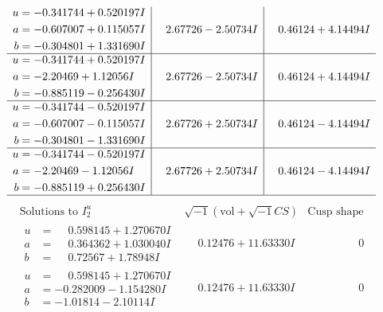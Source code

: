 \documentclass[1p]{elsarticle_modified}
\theoremstyle{definition}
\newcommand{\I}{\sqrt{-1}}
\begin{document}
$$\begin{array}{c|c|c}
\begin{aligned}
u &= -0.341744 + 0.520197 I \\
a &= -0.607007 + 0.115057 I \\
b &= -0.304801 + 1.331690 I\end{aligned}
 & \phantom{-}2.67726 - 2.50734 I & \phantom{-}0.46124 + 4.14494 I \\ \hline\begin{aligned}
u &= -0.341744 + 0.520197 I \\
a &= -2.20469 + 1.12056 I \\
b &= -0.885119 - 0.256430 I\end{aligned}
 & \phantom{-}2.67726 - 2.50734 I & \phantom{-}0.46124 + 4.14494 I \\ \hline\begin{aligned}
u &= -0.341744 - 0.520197 I \\
a &= -0.607007 - 0.115057 I \\
b &= -0.304801 - 1.331690 I\end{aligned}
 & \phantom{-}2.67726 + 2.50734 I & \phantom{-}0.46124 - 4.14494 I \\ \hline\begin{aligned}
u &= -0.341744 - 0.520197 I \\
a &= -2.20469 - 1.12056 I \\
b &= -0.885119 + 0.256430 I\end{aligned}
 & \phantom{-}2.67726 + 2.50734 I & \phantom{-}0.46124 - 4.14494 I\\
 \hline 
 \end{array}$$\newpage$$\begin{array}{c|c|c}  
\text{Solutions to }I^u_{2}& \I (\text{vol} + \sqrt{-1}CS) & \text{Cusp shape}\\
 \hline 
\begin{aligned}
u &= \phantom{-}0.598145 + 1.270670 I \\
a &= \phantom{-}0.364362 + 1.030040 I \\
b &= \phantom{-}0.72567 + 1.78948 I\end{aligned}
 & \phantom{-}0.12476 + 11.63330 I & \phantom{-0.000000 } 0 \\ \hline\begin{aligned}
u &= \phantom{-}0.598145 + 1.270670 I \\
a &= -0.282009 - 1.154280 I \\
b &= -1.01814 - 2.10114 I\end{aligned}
 & \phantom{-}0.12476 + 11.63330 I & \phantom{-0.000000 } 0 \\ \hline\begin{aligned}

\end{aligned}
\end{array}$$
\end{document}

